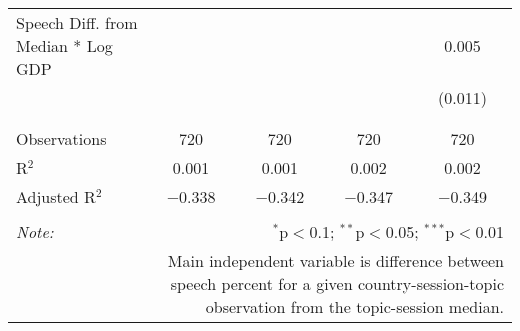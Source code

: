 \begin{table}[!htbp]
\begin{tabular}{@{\extracolsep{5pt}}lcccc}
 Speech Diff. from Median * Log GDP &  &  &  & 0.005 \\ 
  &  &  &  & (0.011) \\ 
  & & & & \\ 
\hline \\[-1.8ex] 
Observations & 720 & 720 & 720 & 720 \\ 
R$^{2}$ & 0.001 & 0.001 & 0.002 & 0.002 \\ 
Adjusted R$^{2}$ & $-$0.338 & $-$0.342 & $-$0.347 & $-$0.349 \\ 
\hline 
\hline \\[-1.8ex] 
\textit{Note:}  & \multicolumn{4}{r}{$^{*}$p$<$0.1; $^{**}$p$<$0.05; $^{***}$p$<$0.01} \\ 
 & \multicolumn{4}{r}{Main independent variable is difference between speech percent for a given country-session-topic observation from the topic-session median.} \\ 
\end{tabular} 
\end{table} 

